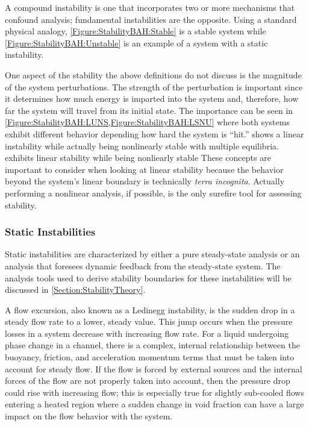 A compound instability is one that incorporates two or more mechanisms that confound analysis; fundamental instabilities are the opposite.  Using a standard physical analogy, \cref{Figure:StabilityBAH:Stable} is a stable system while \cref{Figure:StabilityBAH:Unstable} is an example of a system with a static instability.

One aspect of the stability the above definitions do not discuss is the magnitude of the system perturbations.
The strength of the perturbation is important since it determines how much energy is imparted into the system and, therefore, how far the system will travel from its initial state.
The importance can be seen in \cref{Figure:StabilityBAH:LUNS,Figure:StabilityBAH:LSNU} where both systems exhibit different behavior depending how hard the system is ``hit.''
 shows a linear instability while actually being nonlinearly stable with multiple equilibria.
 exhibits linear stability while being nonliearly stable
These concepts are important to consider when looking at linear stability because the behavior beyond the system's linear boundary is technically \textit{terra incognita}.
Actually performing a nonlinear analysis, if possible, is the only surefire tool for assessing stability.


\subsubsection{Static Instabilities}
Static instabilities are characterized by either a pure steady-state analysis or an analysis that foresees dynamic feedback from the steady-state system.
The analysis tools used to derive stability boundaries for these instabilities will be discussed in \cref{Section:StabilityTheory}.

A flow excursion, also known as a Ledinegg instability, is the sudden drop in a steady flow rate to a lower, steady value.
This jump occurs when the pressure losses in a system decrease with increasing flow rate.
For a liquid undergoing phase change in a channel, there is a complex, internal relationship between the buoyancy, friction, and acceleration momentum terms that must be taken into account for steady flow.
If the flow is forced by external sources and the internal forces of the flow are not properly taken into account, then the pressure drop could rise with increasing flow; this is especially true for slightly sub-cooled flows entering a heated region where a sudden change in void fraction can have a large impact on the flow behavior with the system.

